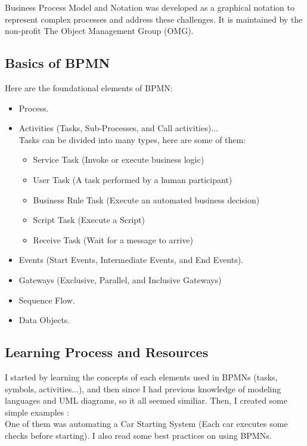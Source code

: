 \documentclass[12pt]{article}
\begin{document}
{  Business Process Model and Notation was developed as a graphical notation to represent complex processes and address these challenges. It is maintained by the non-profit The Object Management Group (OMG).

  \subsection{Basics of BPMN}

  Here are the foundational elements of BPMN:

  \begin{itemize}[noitemsep,nolistsep]
    \item Process.
    \item Activities (Tasks, Sub-Processes, and Call activities)...\\
      Tasks can be divided into many types, here are some of them:
      \begin{itemize}[noitemsep,nolistsep]
        \item Service Task (Invoke or execute business logic)
        \item User Task (A task performed by a human participant)
        \item Business Rule Task (Execute an automated business decision)
        \item Script Task (Execute a Script)
        \item Receive Task (Wait for a message to arrive)
      \end{itemize}

    \item Events (Start Events, Intermediate Events, and End Events).
    \item Gateways (Exclusive, Parallel, and Inclusive Gateways)
    \item Sequence Flow.
    \item Data Objects.
  \end{itemize}

  \subsection{Learning Process and Resources}
  I started by learning the concepts of each elements used in BPMNs (tasks, symbols, activities...), and then since I had previous knowledge of modeling languages and UML diagrams, so it all seemed similiar.
  Then, I created some simple examples :
  \\
  One of them was automating a Car Starting System (Each car executes some checks before starting).
  I also read some best practices on using BPMNs.

}
\end{document}
